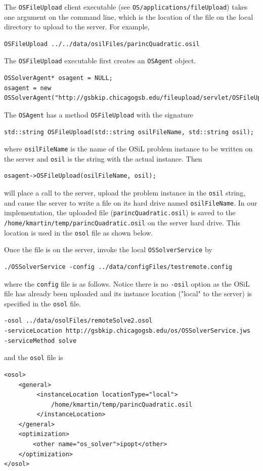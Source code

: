 \documentclass[11pt]{article}
\renewcommand{\_}{{\char"5F}}
\renewcommand{\{}{{\char"7B}}
\renewcommand{\}}{{\char"7D}}
\renewcommand{\^}{{\char"0D}}
\renewcommand{\'}{{\char"0D}}
\begin{document}
\begin{enumerate}[Step 1:]
The {\tt OSFileUpload} client executable (see {\tt OS/applications/fileUpload}) takes one argument on the command line, 
which is the location of the file on the local directory to upload to the server. For example,
\begin{verbatim}
OSFileUpload ../../data/osilFiles/parincQuadratic.osil
\end{verbatim}
The {\tt OSFileUpload} executable first creates an {\tt OSAgent} object.
\begin{verbatim}
OSSolverAgent* osagent = NULL;
osagent = new OSSolverAgent("http://gsbkip.chicagogsb.edu/fileupload/servlet/OSFileUpload");
\end{verbatim}
The {\tt OSAgent}  has a method {\tt OSFileUpload} with the signature
\begin{verbatim}
std::string OSFileUpload(std::string osilFileName, std::string osil);
\end{verbatim}
where {\tt osilFileName} is  the name of the OSiL problem instance to be written on the server and {\tt osil} 
is the string with the actual instance. Then
\begin{verbatim}
osagent->OSFileUpload(osilFileName, osil);
\end{verbatim}
will place a call to the server, upload the problem instance in the {\tt osil} string, and cause the server 
to write a file on its hard drive named {\tt osilFileName}. In our implementation, the uploaded file 
({\tt parincQuadratic.osil}) is saved to the {\tt/home/kmartin/temp/parincQuadratic.osil} on the server hard drive. 
This location is used in the {\tt osol} file as shown below.

Once the file is on the server, invoke the local {\tt OSSolverService} by
\begin{verbatim}
./OSSolverService -config ../data/configFiles/testremote.config
\end{verbatim}
where the {\tt config} file is as follows. Notice there is no {\tt -osil}  option as the OSiL file has already 
been uploaded and its instance location ("local" to the server) is specified in the {\tt osol} file.
\begin{verbatim}
-osol ../data/osolFiles/remoteSolve2.osol
-serviceLocation http://gsbkip.chicagogsb.edu/os/OSSolverService.jws
-serviceMethod solve
\end{verbatim}
and the {\tt osol} file is
\begin{verbatim}
<osol>
    <general>
         <instanceLocation locationType="local">
             /home/kmartin/temp/parincQuadratic.osil
         </instanceLocation>
    </general>
    <optimization>
        <other name="os_solver">ipopt</other>
    </optimization>
</osol>
\end{verbatim}


\end{enumerate}
\end{document}
